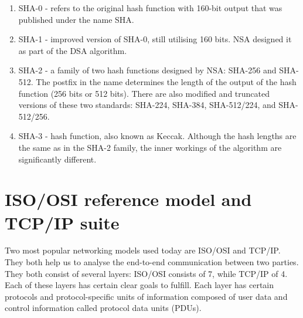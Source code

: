 \begin{itemize}
\begin{enumerate}
        \item SHA-0 - refers to the original hash function with 160-bit output that was published under the name SHA.
        \item SHA-1 - improved version of SHA-0, still utilising 160 bits. NSA designed it as part of the DSA algorithm.
        \item SHA-2 - a family of two hash functions designed by NSA: SHA-256 and SHA-512. The postfix in the name determines the length of the output of the hash function (256 bits or 512 bits). There are also modified and truncated versions of these two standards: SHA-224, SHA-384, SHA-512/224, and SHA-512/256.
        \item SHA-3 - hash function, also known as Keccak. Although the hash lengths are the same as in the SHA-2 family, the inner workings of the algorithm are significantly different.
    \end{enumerate}
\end{itemize}


\section{ISO/OSI reference model and TCP/IP suite}
Two most popular networking models used today are ISO/OSI and TCP/IP. They both help us to analyse the end-to-end communication between two parties. They both consist of several layers: ISO/OSI consists of 7, while TCP/IP of 4. Each of these layers has certain clear goals to fulfill. Each layer has certain protocols and protocol-specific units of information composed of user data and control information called protocol data units (PDUs).

